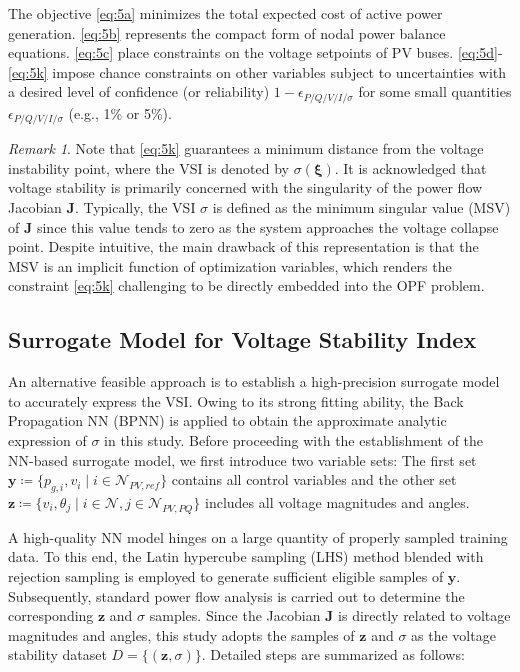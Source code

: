 \documentclass[journal]{IEEEtran}
\theoremstyle{definition}
\theoremstyle{remark}
\newtheorem{remark}{Remark}
\begin{document}
The objective \eqref{eq:5a} minimizes the total expected cost of active power generation. \eqref{eq:5b} represents the compact form of nodal power balance equations. \eqref{eq:5c} place constraints on the voltage setpoints of PV buses. \eqref{eq:5d}-\eqref{eq:5k} impose chance constraints on other variables subject to uncertainties 
with a desired level of confidence (or reliability)
$1-\epsilon_{P/Q/V/I/\sigma}$ for some small quantities $\epsilon_{P/Q/V/I/\sigma}$ (e.g., 1\% or 5\%). 
\begin{remark}
    Note that \eqref{eq:5k} guarantees a minimum distance from the voltage instability point, where the VSI is denoted by $\sigma(\boldsymbol{\xi})$. It is acknowledged that voltage stability is primarily concerned with the singularity of the power flow Jacobian $\boldsymbol{J}$. Typically, the VSI $\sigma$ is defined as the minimum singular value (MSV) of $\boldsymbol{J}$ since this value tends to zero as the system approaches the voltage collapse point. Despite intuitive, the main drawback of this representation is that the MSV is an implicit function of optimization variables, which renders the constraint \eqref{eq:5k} challenging to be directly embedded into the OPF problem.
\end{remark}
\subsection{Surrogate Model for Voltage Stability Index}
An alternative feasible approach is to establish a high-precision surrogate model to accurately express the VSI. Owing to its strong fitting ability, the Back Propagation NN (BPNN) is applied to obtain the approximate analytic expression of $\sigma$ in this study. 
Before proceeding with the establishment of the NN-based surrogate model, we first introduce two variable sets: The first set $\boldsymbol{y}\coloneqq\{p_{g,i},v_i\mid i\in\mathcal{N}_{PV,ref}\}$ contains all control variables and the other set $\boldsymbol{z}\coloneqq\{v_i,\theta_j\mid i\in\mathcal{N},j\in\mathcal{N}_{PV,PQ}\}$ includes all voltage magnitudes and angles.  

A high-quality NN model hinges on a large quantity of properly sampled training data. To this end, the Latin hypercube sampling (LHS) method blended with rejection sampling is employed to generate sufficient eligible samples of $\boldsymbol{y}$. Subsequently, standard power flow analysis is carried out to determine the corresponding $\boldsymbol{z}$ and $\sigma$ samples.
Since the Jacobian $\boldsymbol{J}$ is directly related to voltage magnitudes and angles, this study adopts the samples of $\boldsymbol{z}$ and $\sigma$ as the voltage stability dataset $D=\{(\boldsymbol{z},\sigma)\}$. Detailed steps are summarized as follows:
\end{document}
